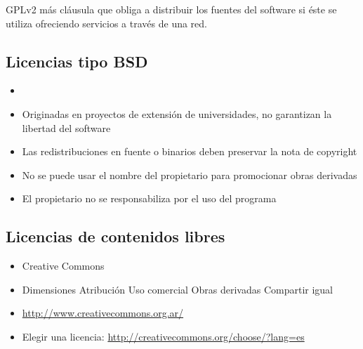 GPLv2 más cláusula que obliga a distribuir los fuentes del software si éste se utiliza ofreciendo servicios a través de una red.

\subsection {Licencias tipo BSD}
\begin{itemize}
	\item {}
	\item Originadas en proyectos de extensión de universidades, no garantizan la libertad del software

	\item Las redistribuciones en fuente o binarios deben preservar la nota de copyright
	\item No se puede usar el nombre del propietario para promocionar obras derivadas
	\item El propietario no se responsabiliza por el uso del programa
\end{itemize}






\subsection {Licencias de contenidos libres}
\begin{itemize}
	\item Creative Commons
	\item Dimensiones 
	\subitem Atribución
	\subitem Uso comercial
	\subitem Obras derivadas
	\subitem Compartir igual
	\item \url{http://www.creativecommons.org.ar/}
	\item Elegir una licencia: \url {http://creativecommons.org/choose/?lang=es}
\end{itemize}



